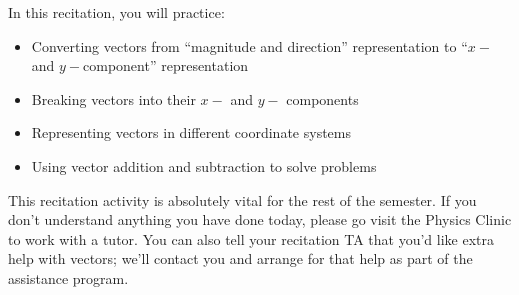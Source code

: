 \documentclass[12pt]{article}
\newcommand{\BI}{\begin{itemize}}
\newcommand{\EI}{\end{itemize}}
\begin{document}
\Large
\centerline{}
\normalsize
\centerline{}


\rmfamily

\medskip

\rm In this recitation, you will practice:

\BI
\item Converting vectors from ``magnitude and direction'' representation to ``$x-$ and $y-$component'' representation
\item Breaking vectors into their $x-$ and $y-$ components
\item Representing vectors in different coordinate systems
\item Using vector addition and subtraction to solve problems
\EI

This recitation activity is absolutely vital for the rest of the semester. If you don't understand anything you have done today, please go visit the Physics Clinic to work with a tutor. You can also tell your recitation TA that you'd like extra help with vectors; we'll contact you and arrange for that help as part of the assistance program.
\end{document}
